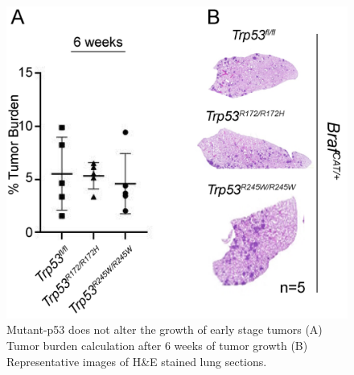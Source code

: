 \begin{figure}
\hypertarget{fig:3.3}{%
\centering
\includegraphics[width=1\textwidth,height=\textheight]{images/p5313.png}
\caption{Mutant-p53 does not alter the growth of early stage tumors (A) Tumor burden calculation after 6 weeks of tumor growth (B) Representative images of H\&E stained lung sections.}\label{fig:3.3}
}
\end{figure}

